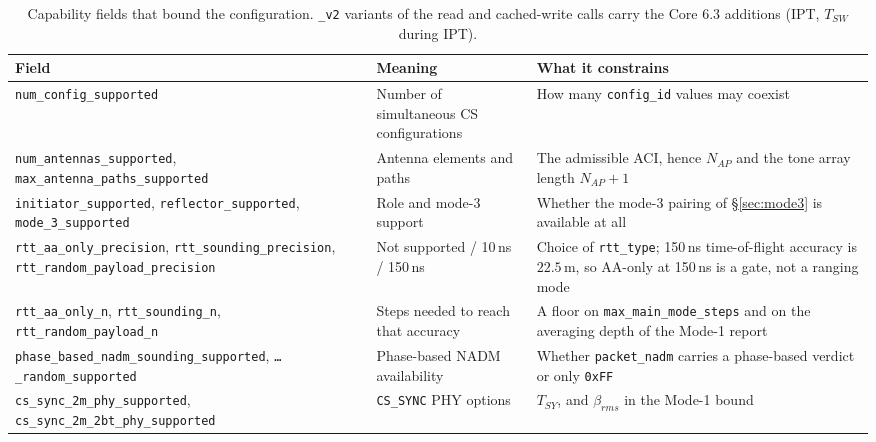 \documentclass[11pt,a4paper]{article}
\newcommand{\code}[1]{\texttt{\small #1}}
\newcommand{\NADM}{\ensuremath{\mathrm{NADM}}}
\newcommand{\Nap}{\ensuremath{N_{AP}}}
\newcommand{\Tsy}{\ensuremath{T_{SY}}}
\newcommand{\Tsw}{\ensuremath{T_{SW}}}
\begin{document}
\begin{table}[htb]
\caption{Capability fields that bound the configuration. \code{\_\allowbreak{}v2} variants of the read and
cached-write calls carry the Core 6.3 additions (IPT, \Tsw{} during IPT).}
\label{tab:caps}
\centering\scriptsize
\begin{tabular}{@{}L{44mm}L{42mm}L{48mm}@{}}
\toprule
Field & Meaning & What it constrains \\
\midrule
\code{num\_\allowbreak{}config\_\allowbreak{}supported} & Number of simultaneous CS configurations & How many \code{config\_\allowbreak{}id} values may coexist \\
\code{num\_\allowbreak{}antennas\_\allowbreak{}supported}, \code{max\_\allowbreak{}antenna\_\allowbreak{}paths\_\allowbreak{}supported} & Antenna elements and paths & The admissible ACI, hence $\Nap$ and the tone array length $\Nap+1$ \\
\code{initiator\_\allowbreak{}supported}, \code{reflector\_\allowbreak{}supported}, \code{mode\_\allowbreak{}3\_\allowbreak{}supported} & Role and mode-3 support & Whether the mode-3 pairing of \S\ref{sec:mode3} is available at all \\
\code{rtt\_\allowbreak{}aa\_\allowbreak{}only\_\allowbreak{}precision}, \code{rtt\_\allowbreak{}sounding\_\allowbreak{}precision}, \code{rtt\_\allowbreak{}random\_\allowbreak{}payload\_\allowbreak{}precision} & Not supported / 10\,ns / 150\,ns & Choice of \code{rtt\_\allowbreak{}type}; 150\,ns time-of-flight accuracy is $22.5$\,m, so AA-only at 150\,ns is a gate, not a ranging mode \\
\code{rtt\_\allowbreak{}aa\_\allowbreak{}only\_\allowbreak{}n}, \code{rtt\_\allowbreak{}sounding\_\allowbreak{}n}, \code{rtt\_\allowbreak{}random\_\allowbreak{}payload\_\allowbreak{}n} & Steps needed to reach that accuracy & A floor on \code{max\_\allowbreak{}main\_\allowbreak{}mode\_\allowbreak{}steps} and on the averaging depth of the Mode-1 report \\
\code{phase\_\allowbreak{}based\_\allowbreak{}nadm\_\allowbreak{}sounding\_\allowbreak{}supported}, \code{\ldots\_\allowbreak{}random\_\allowbreak{}supported} & Phase-based $\NADM$ availability & Whether \code{packet\_\allowbreak{}nadm} carries a phase-based verdict or only \code{0xFF} \\
\code{cs\_\allowbreak{}sync\_\allowbreak{}2m\_\allowbreak{}phy\_\allowbreak{}supported}, \code{cs\_\allowbreak{}sync\_\allowbreak{}2m\_\allowbreak{}2bt\_\allowbreak{}phy\_\allowbreak{}supported} & \code{CS\_\allowbreak{}SYNC} PHY options & \Tsy{}, and $\beta_{rms}$ in the Mode-1 bound \\

\end{tabular}
\end{table}
\end{document}
